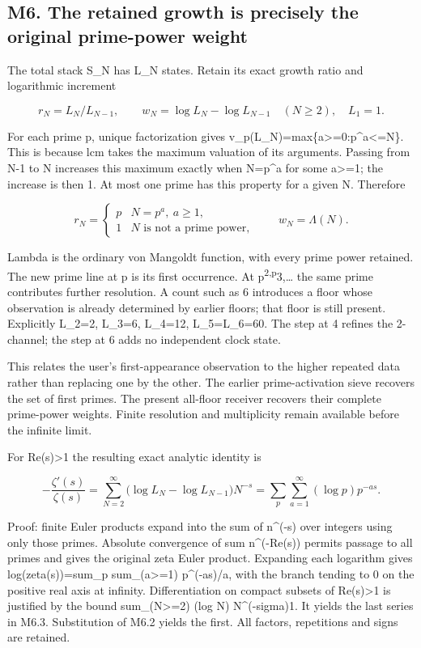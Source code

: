 \documentclass[
]{article}
\begin{document}
\subsection{M6. The retained growth is precisely the original
prime-power
weight}\label{m6.-the-retained-growth-is-precisely-the-original-prime-power-weight}

The total stack S\_N has L\_N states. Retain its exact growth ratio and
logarithmic increment

\[
r_N=L_N/L_{N-1},\qquad
w_N=\log L_N-\log L_{N-1}\quad(N\ge2),\quad L_1=1.
\tag{M6.1}
\]

For each prime p, unique factorization gives
v\_p(L\_N)=max\{a\textgreater=0:p\^{}a\textless=N\}. This is because lcm
takes the maximum valuation of its arguments. Passing from N-1 to N
increases this maximum exactly when N=p\^{}a for some a\textgreater=1;
the increase is then 1. At most one prime has this property for a given
N. Therefore

\[
r_N=\begin{cases}p&N=p^a,\ a\ge1,\\1&N\text{ is not a prime power},\end{cases}
\qquad
\boxed{w_N=\Lambda(N).}
\tag{M6.2}
\]

Lambda is the ordinary von Mangoldt function, with every prime power
retained. The new prime line at p is its first occurrence. At
p\textsuperscript{2,p}3,\ldots{} the same prime contributes further
resolution. A count such as 6 introduces a floor whose observation is
already determined by earlier floors; that floor is still present.
Explicitly L\_2=2, L\_3=6, L\_4=12, L\_5=L\_6=60. The step at 4 refines
the 2-channel; the step at 6 adds no independent clock state.

This relates the user's first-appearance observation to the higher
repeated data rather than replacing one by the other. The earlier
prime-activation sieve recovers the set of first primes. The present
all-floor receiver recovers their complete prime-power weights. Finite
resolution and multiplicity remain available before the infinite limit.

For Re(s)\textgreater1 the resulting exact analytic identity is

\[
\boxed{-\frac{\zeta'(s)}{\zeta(s)}
=\sum_{N=2}^{\infty}
\bigl(\log L_N-\log L_{N-1}\bigr)N^{-s}
=\sum_p\sum_{a=1}^{\infty}(\log p)p^{-as}.}
\tag{M6.3}
\]

Proof: finite Euler products expand into the sum of n\^{}(-s) over
integers using only those primes. Absolute convergence of sum
n\^{}(-Re(s)) permits passage to all primes and gives the original zeta
Euler product. Expanding each logarithm gives log(zeta(s))=sum\_p
sum\_(a\textgreater=1) p\^{}(-as)/a, with the branch tending to 0 on the
positive real axis at infinity. Differentiation on compact subsets of
Re(s)\textgreater1 is justified by the bound sum\_(N\textgreater=2) (log
N) N\^{}(-sigma)1. It yields the last series in M6.3. Substitution of
M6.2 yields the first. All factors, repetitions and signs are retained.
\end{document}
